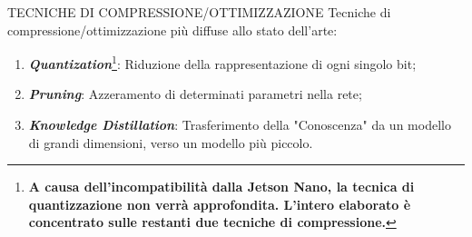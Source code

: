 \begin{frame}{TECNICHE DI COMPRESSIONE/OTTIMIZZAZIONE}
    Tecniche di compressione/ottimizzazione più diffuse allo stato dell'arte:
    \begin{enumerate}
        \item {\bfseries{\emph{Quantization}}}{\renewcommand{\thefootnote}{\fnsymbol{footnote}}\footnote[1]{\scriptsize \bfseries A causa dell'incompatibilità dalla Jetson Nano, la tecnica di quantizzazione non verrà approfondita. L'intero elaborato è concentrato sulle restanti due tecniche di compressione.}}: Riduzione della rappresentazione di ogni singolo bit;
        \item {\bfseries{\emph{Pruning}}}\footnotemark[3]: Azzeramento di determinati parametri nella rete;
        \item {\bfseries{\emph{Knowledge Distillation}}}\footnotemark[4]: Trasferimento della "Conoscenza" da un modello di grandi dimensioni, verso un modello più piccolo. 
    \end{enumerate}
\end{frame}